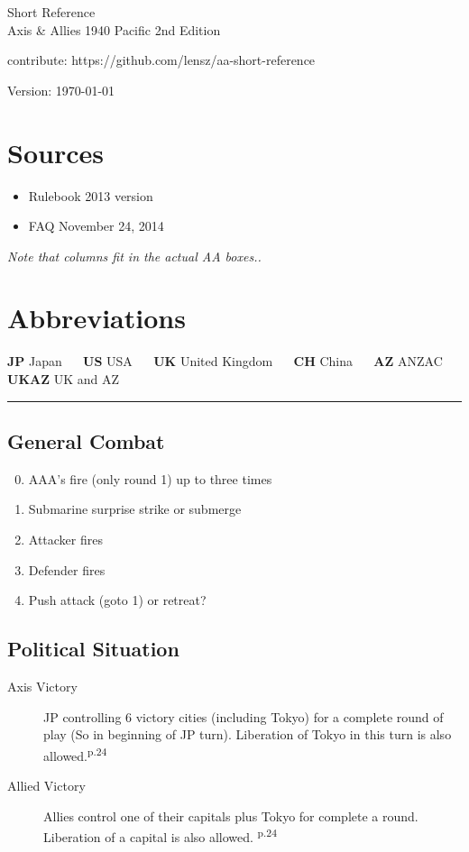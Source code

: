 \documentclass[10pt,twoside]{article}
\begin{document}
\begin{multicols*}{3}
\begin{center}
{\Large Short Reference}\\
\vspace{.2cm}
{\large Axis \& Allies 1940 Pacific 2nd Edition}

\vspace{.5cm}
contribute: https://github.com/lensz/aa-short-reference

\vspace{.5cm}
Version: \today
\end{center}

\section*{{\normalsize Sources}}
\begin{itemize}
\item Rulebook 2013 version
\item FAQ November 24, 2014
\end{itemize}

\noindent\textsl{Note that columns fit in the actual AA boxes..}

\section*{{\normalsize Abbreviations}}
\textbf{JP} Japan ~~ \textbf{US} USA ~~ \textbf{UK} United Kingdom ~~ \textbf{CH} China ~~ \textbf{AZ} ANZAC ~~ \textbf{UKAZ} UK and AZ

\begin{center}
\rule{6.5cm}{0.4pt}
\end{center}


\subsection*{General Combat}
\begin{enumerate}
\setcounter{enumi}{-1}
\item AAA's fire (only round 1) up to three times
\item Submarine surprise strike or submerge
\item Attacker fires
\item Defender fires
\item Push attack (goto 1) or retreat?
\end{enumerate}

\subsection*{Political Situation}
\begin{description}
\item[Axis Victory] JP controlling 6 victory cities (including Tokyo) for a complete round of play (So in beginning of JP turn). Liberation of Tokyo in this turn is also allowed.\textsuperscript{p.24}
\item[Allied Victory] Allies control one of their capitals plus Tokyo for complete a round. Liberation of a capital is also allowed. \textsuperscript{p.24}
\end{description}


\end{multicols*}
\end{document}
